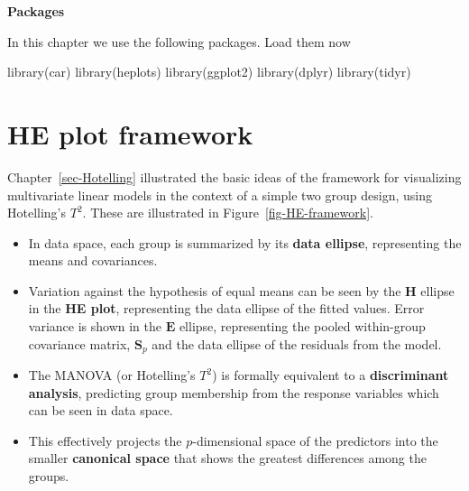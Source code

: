 \documentclass[
  letterpaper,
  10pt,
  krantz2]{krantz}
\makeatletter
\newenvironment{Shaded}{\begin{snugshade}}{\end{snugshade}}
\newcommand{\FunctionTok}[1]{\textcolor[rgb]{0.28,0.35,0.67}{#1}}
\newcommand{\NormalTok}[1]{\textcolor[rgb]{0.00,0.23,0.31}{#1}}
\newenvironment{kframe}{%
  \medskip{}
  \setlength{\fboxsep}{.8em}
  \def\at@end@of@kframe{}%
  \ifinner\ifhmode%
  \def\at@end@of@kframe{\end{minipage}}%
  \begin{minipage}{\columnwidth}%
  \fi\fi%
  \def\FrameCommand##1{\hskip\@totalleftmargin \hskip-\fboxsep
  \colorbox{shadecolor}{##1}\hskip-\fboxsep
      \hskip-\linewidth \hskip-\@totalleftmargin \hskip\columnwidth}%
  \MakeFramed {\advance\hsize-\width
    \@totalleftmargin\z@ \linewidth\hsize
    \@setminipage}}%
{\par\unskip\endMakeFramed%
  \at@end@of@kframe}
\renewenvironment{Shaded}{\begin{kframe}}{\end{kframe}}
\makeatother
\begin{document}
\textbf{Packages}

In this chapter we use the following packages. Load them now

\begin{Shaded}
\begin{Highlighting}[]
\FunctionTok{library}\NormalTok{(car)}
\FunctionTok{library}\NormalTok{(heplots)}
\FunctionTok{library}\NormalTok{(ggplot2)}
\FunctionTok{library}\NormalTok{(dplyr)}
\FunctionTok{library}\NormalTok{(tidyr)}
\end{Highlighting}
\end{Shaded}

\section{HE plot framework}\label{sec-he-framework}

Chapter~\ref{sec-Hotelling} illustrated the basic ideas of the framework
for visualizing multivariate linear models in the context of a simple
two group design, using Hotelling's \(T^2\). These are illustrated in
Figure~\ref{fig-HE-framework}.

\begin{itemize}
\item
  In data space, each group is summarized by its \textbf{data ellipse},
  representing the means and covariances.
\item
  Variation against the hypothesis of equal means can be seen by the
  \(\mathbf{H}\) ellipse in the \textbf{HE plot}, representing the data
  ellipse of the fitted values. Error variance is shown in the
  \(\mathbf{E}\) ellipse, representing the pooled within-group
  covariance matrix, \(\mathbf{S}_p\) and the data ellipse of the
  residuals from the model.
\item
  The MANOVA (or Hotelling's \(T^2\)) is formally equivalent to a
  \textbf{discriminant analysis}, predicting group membership from the
  response variables which can be seen in data space.
\item
  This effectively projects the \(p\)-dimensional space of the
  predictors into the smaller \textbf{canonical space} that shows the
  greatest differences among the groups.
\end{itemize}
\end{document}
